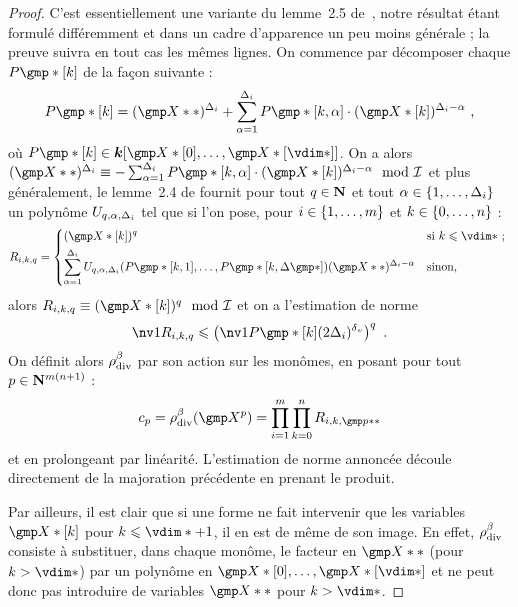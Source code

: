 \begin{proof}
  C'est essentiellement une variante du lemme~2.5 de~\cite{remivg}, notre
  résultat étant formulé différemment et dans un cadre d'apparence un peu
  moins générale ; la preuve suivra en tout cas les mêmes lignes. On commence
  par décomposer chaque \( P\mexp*[\ind] \) de la façon suivante :
  \begin{equation}
    P\mexp*[\ind]
    =
    (\vmp**)^{\Delta_\fct}
    +
    \sum _{\alpha=1}^{\Delta_\fct}
    P\mexp*[\ind, \alpha] \cdot (\vmp*[\ind])^{\Delta_\fct - \alpha}
    \pmm,
  \end{equation}
  où \( P\mexp*[\ind] \in \cdn [ \vmp*[0], \dots, \vmp*[\vdim*] ] \).
  On a alors \(
    (\vmp**)^{\Delta_\fct}
    \equiv
    - \sum _{\alpha=1}^{\Delta_\fct}
    P\mexp*[\ind, \alpha] \cdot (\vmp*[\ind])^{\Delta_\fct - \alpha}
    \mod \Ideal \) et plus généralement, le lemme~2.4 de \cite{remivg} fournit
  pour tout \( q \in {\mathbf{N}} \) et tout \( \alpha \in \lbrace1, \dots,
      \Delta_i\rbrace \) un polynôme \( U_{q, \alpha, \Delta_i} \) tel que
  si l'on pose, pour \( i \in \lbrace1, \dots, m\rbrace \) et \(
    k \in \lbrace 0, \dots, n \rbrace \) :
  \begin{equation}
    R_{\fct, \ind, q}
    =
    \begin{dcases*}
      ( \vmp*[\ind] ) ^q
      & si \( \ind \le \vdim* \) ;
      \\
      \sum _{\alpha=1}^{\Delta_\fct}
      U_{q, \alpha, \Delta_\fct}
      ( P\mexp*[\ind, 1], \dots, P\mexp*[\ind, \Delta\mexp*] )
      (\vmp**)^{\Delta_\fct - \alpha}
      & sinon,
    \end{dcases*}
  \end{equation}
  alors \( R_{\fct, \ind, q} \equiv ( \vmp*[\ind] ) ^q \mod \Ideal \) et
  on a l'estimation de norme
  \begin{equation}
    \nv1{ R_{\fct, \ind, q} }
    \le
    \left(
    \nv1{ P\mexp*[\ind] } (2\Delta_\fct)^\dv
    \right) ^q
    \pmm.
  \end{equation}
  On définit alors \( \rho\sb{\mathrm{div }}^\beta \) par son action sur les monômes, en posant
  pour tout \( p \in {\mathbf{N}}^{m(n+1)} \) :
  \begin{equation}
    c_p
    = \rdiv^\beta(\vmp^p)
    = \prod\fctrange \prod\indrange R_{\fct, \ind, \gmp p**}
  \end{equation}
  et en prolongeant par linéarité. L'estimation de norme annoncée découle
  directement de la majoration précédente en prenant le produit.

  Par ailleurs, il est clair que si une forme ne fait intervenir que les
  variables \( \vmp*[\ind] \) pour \( \ind \le \vdim* + 1 \), il en est de
  même de son image. En effet, \( \rho\sb{\mathrm{div }}^\beta \) consiste à substituer, dans
  chaque monôme, le facteur en \( \vmp** \) (pour \( \ind > \vdim* \)) par un
  polynôme en \( \vmp*[0], \dots, \vmp*[\vdim*] \) et ne peut donc pas
  introduire de variables \( \vmp** \) pour \( \ind > \vdim* \).
\end{proof}

